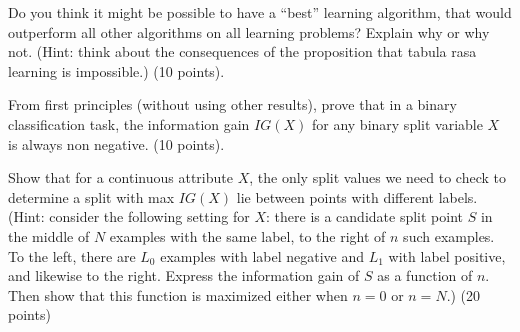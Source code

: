 \documentclass[fleqn]{homework}
\begin{document}
  \begin{problem}{2}
    \begin{question}
      Do you think it might be possible to have a ``best'' learning algorithm,
      that would outperform all other algorithms on all learning problems?
      Explain why or why not.  (Hint: think about the consequences of the
      proposition that tabula rasa learning is impossible.) (10 points).
    \end{question}
  \end{problem}

  \begin{problem}{3}
    \begin{question}
      From first principles (without using other results), prove that in a
      binary classification task, the information gain $IG(X)$ for any binary
      split variable $X$ is always non negative. (10 points).
    \end{question}
  \end{problem}

  \begin{problem}{4}
    \begin{question}
      Show that for a continuous attribute $X$, the only split values we need to
      check to determine a split with max $IG(X)$ lie between points with
      different labels.  (Hint: consider the following setting for $X$: there is
      a candidate split point $S$ in the middle of $N$ examples with the same
      label, to the right of $n$ such examples.  To the left, there are $L_0$
      examples with label negative and $L_1$ with label positive, and likewise
      to the right.  Express the information gain of $S$ as a function of $n$.
      Then show that this function is maximized either when $n=0$ or $n=N$.) (20
      points)
    \end{question}
  \end{problem}
\end{document}

